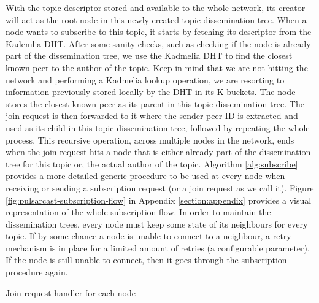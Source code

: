 With the topic descriptor stored and available to the whole network, its
creator will act as the root node in this newly created topic dissemination
tree. When a node wants to subscribe to this topic, it starts by fetching its
descriptor from the Kademlia DHT. After some sanity checks, such as checking if
the node is already part of the dissemination tree, we use the Kadmelia DHT to
find the closest known peer to the author of the topic. Keep in mind that we
are not hitting the network and performing a Kadmelia lookup operation, we are
resorting to information previously stored locally by the DHT in its K buckets.
The node stores the closest known peer as its parent in this topic
dissemination tree. The join request is then forwarded to it where the sender
peer ID is extracted and used as its child in this topic dissemination tree,
followed by repeating the whole process. This recursive operation, across
multiple nodes in the network, ends when the join request hits a node that is
either already part of the dissemination tree for this topic or, the actual
author of the topic. Algorithm \ref{alg:subscribe} provides a more detailed
generic procedure to be used at every node when receiving or sending a
subscription request (or a join request as we call it). Figure
\ref{fig:pulsarcast-subscription-flow} in Appendix \ref{section:appendix}
provides a visual representation of the whole subscription flow. In order to
maintain the dissemination trees, every node must keep some state of its
neighbours for every topic. If by some chance a node is unable to connect to a
neighbour, a retry mechanism is in place for a limited amount of retries (a
configurable parameter). If the node is still unable to connect, then it goes
through the subscription procedure again.

\begin{algorithm}
  \SetAlgoLined
  \caption{Join request handler for each node}
    \label{alg:subscribe}
\end{algorithm}

